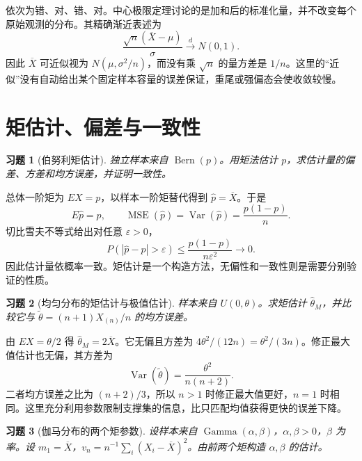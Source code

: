 \documentclass[12pt,fontset=fandol]{ctexart}
\newtheorem{exercise}{习题}[section]
\begin{document}
\begin{solve}\label{a:M-F-C13}依次为错、对、错、对。中心极限定理讨论的是加和后的标准化量，并不改变每个原始观测的分布。其精确渐近表述为\[\frac{\sqrt n(\overline X-\mu)}{\sigma}\xrightarrow{d}N(0,1).\]因此 $\overline X$ 可近似视为 $N(\mu,\sigma^2/n)$，而没有乘 $\sqrt n$ 的量方差是 $1/n$。这里的“近似”没有自动给出某个固定样本容量的误差保证，重尾或强偏态会使收敛较慢。\end{solve}

\clearpage\section{矩估计、偏差与一致性}

\begin{exercise}[伯努利矩估计]\label{q:B9.1}
独立样本来自 $\operatorname{Bern}(p)$。用矩法估计 $p$，求估计量的偏差、方差和均方误差，并证明一致性。\par{}
\end{exercise}

\begin{solve}\label{a:B9.1}总体一阶矩为 $EX=p$，以样本一阶矩替代得到 $\widehat p=\overline X$。于是\[E\widehat p=p,\qquad\operatorname{MSE}(\widehat p)=\operatorname{Var}(\widehat p)=\frac{p(1-p)}n.\]切比雪夫不等式给出对任意 $\varepsilon>0$，\[P(|\widehat p-p|>\varepsilon)\le\frac{p(1-p)}{n\varepsilon^2}\longrightarrow0.\]因此估计量依概率一致。矩估计是一个构造方法，无偏性和一致性则是需要分别验证的性质。\end{solve}

\begin{exercise}[均匀分布的矩估计与极值估计]\label{q:B9.2}
样本来自 $U(0,\theta)$。求矩估计 $\widehat\theta_M$，并比较它与 $\widetilde\theta=(n+1)X_{(n)}/n$ 的均方误差。\par{}
\end{exercise}

\begin{solve}\label{a:B9.2}由 $EX=\theta/2$ 得 $\widehat\theta_M=2\overline X$。它无偏且方差为 $4\theta^2/(12n)=\theta^2/(3n)$。修正最大值估计也无偏，其方差为\[\operatorname{Var}(\widetilde\theta)=\frac{\theta^2}{n(n+2)}.\]二者均方误差之比为 $(n+2)/3$，所以 $n>1$ 时修正最大值更好，$n=1$ 时相同。这里充分利用参数限制支撑集的信息，比只匹配均值获得更快的误差下降。\end{solve}

\begin{exercise}[伽马分布的两个矩参数]\label{q:B9.3}
设样本来自 $\operatorname{Gamma}(\alpha,\beta)$，$\alpha,\beta>0$，$\beta$ 为率。设 $m_1=\overline X$，$v_n=n^{-1}\sum_i(X_i-\overline X)^2$。由前两个矩构造 $\alpha,\beta$ 的估计。\par{}
\end{exercise}
\end{document}
